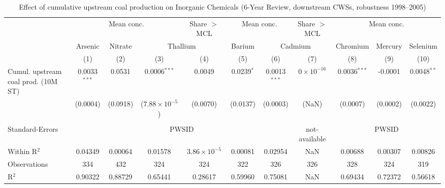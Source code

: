 
\begin{table}[htbp]
   
   \caption{\label{tab:6yr_huc02fe_inorg_2005} Effect of cumulative upstream coal production on Inorganic Chemicals (6-Year Review, downstream CWSs, robustness 1998--2005)}
   \bigskip
   
   \centering
   
   \begin{adjustbox}{width = \textwidth, center}
      
      
      \begin{tabular}{lcccccccccc}
         \toprule
         
          & \multicolumn{3}{c}{Mean conc.} & Share $>$ MCL & \multicolumn{2}{c}{Mean conc.} & Share $>$ MCL & \multicolumn{3}{c}{Mean conc.}\\
         
          & Arsenic & Nitrate & \multicolumn{2}{c}{Thallium} & Barium & \multicolumn{2}{c}{Cadmium} & Chromium & Mercury & Selenium \\ 
         
                                             & (1)            & (2)           & (3)                     & (4)                   & (5)           & (6)            & (7)                 & (8)            & (9)           & (10)\\  
         
         \midrule 
         Cumul. upstream coal prod. (10M ST) & 0.0033$^{***}$ & 0.0531        & 0.0006$^{***}$          & 0.0049                & 0.0239$^{*}$  & 0.0013$^{***}$ & $0\times 10^{-16}$  & 0.0036$^{***}$ & -0.0001       & 0.0048$^{**}$\\   
                                             & (0.0004)       & (0.0918)      & ($7.88\times 10^{-5}$)  & (0.0070)              & (0.0137)      & (0.0003)       & (NaN)               & (0.0007)       & (0.0002)      & (0.0022)\\   
         
          \\
         
         Standard-Errors & \multicolumn{6}{c}{PWSID} & not-available & \multicolumn{3}{c}{PWSID} \\ 
         Within R$^2$                        & 0.04349        & 0.00064       & 0.01578                 & $3.86\times 10^{-5}$  & 0.00081       & 0.02954        & NaN                 & 0.00688        & 0.00307       & 0.00826\\  
         Observations                        & 334            & 432           & 324                     & 324                   & 322           & 326            & 326                 & 328            & 324           & 319\\  
         R$^2$                               & 0.90322        & 0.88729       & 0.65441                 & 0.28617               & 0.59960       & 0.75081        & NaN                 & 0.69434        & 0.72372       & 0.56618\\  
         

\end{tabular}
\end{adjustbox}
\end{table}

